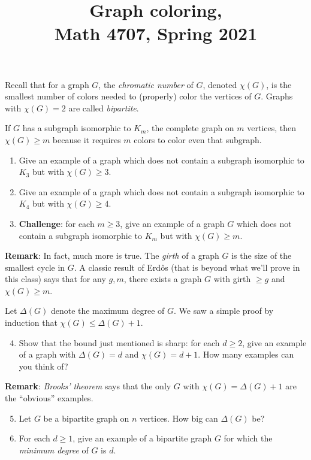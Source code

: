\documentclass[11pt]{article}
\title{Graph coloring, \\Math 4707, Spring 2021}
\date{}
\begin{document}
\maketitle
\thispagestyle{empty}

Recall that for a graph $G$, the \emph{chromatic number} of $G$, denoted $\chi(G)$, is the smallest number of colors needed to (properly) color the vertices of $G$. Graphs with $\chi(G)=2$ are called \emph{bipartite}.

If $G$ has a subgraph isomorphic to $K_m$, the complete graph on $m$ vertices, then $\chi(G) \geq m$ because it requires $m$ colors to color even that subgraph.

\begin{enumerate}
\item Give an example of a graph which does not contain a subgraph isomorphic to $K_3$ but with $\chi(G) \geq 3$.
\item Give an example of a graph which does not contain a subgraph isomorphic to $K_4$ but with $\chi(G) \geq 4$.
\item {\bf Challenge}: for each $m \geq 3$, give an example of a graph $G$ which does not contain a subgraph isomorphic to $K_m$ but with $\chi(G) \geq m$.
\end{enumerate}

{\bf Remark}: In fact, much more is true. The \emph{girth} of a graph $G$ is the size of the smallest cycle in $G$. A classic result of Erd\H{o}s (that is beyond what we'll prove in this class) says that for any $g,m$, there exists a graph $G$ with girth $\geq g$ and $\chi(G) \geq m$.
\medskip

Let $\Delta(G)$ denote the maximum degree of $G$. We saw a simple proof by induction that $\chi(G) \leq \Delta(G)+1$.

\begin{enumerate}
\setcounter{enumi}{3}
\item Show that the bound just mentioned is sharp: for each $d \geq 2$, give an example of a graph with $\Delta(G)=d$ and $\chi(G) = d+1$. How many examples can you think of?
\end{enumerate}

{\bf Remark}: \emph{Brooks' theorem} says that the only $G$ with $\chi(G) = \Delta(G)+1$ are the ``obvious'' examples.

\begin{enumerate}
\setcounter{enumi}{4}
\item Let $G$ be a bipartite graph on $n$ vertices. How big can $\Delta(G)$ be?
\item For each $d \geq 1$, give an example of a bipartite graph $G$ for which the \emph{minimum degree} of $G$ is $d$.
\end{enumerate}
\end{document}
